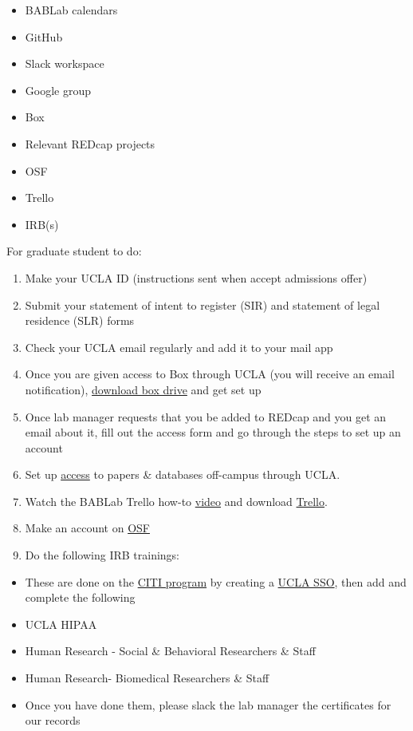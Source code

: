 \documentclass[]{book}
\providecommand{\tightlist}{%
  \setlength{\itemsep}{0pt}\setlength{\parskip}{0pt}}
\begin{document}
\begin{itemize}
\tightlist
\item
  BABLab calendars
\item
  GitHub
\item
  Slack workspace
\item
  Google group
\item
  Box
\item
  Relevant REDcap projects
\item
  OSF
\item
  Trello
\item
  IRB(s)
\end{itemize}

For graduate student to do:

\begin{enumerate}
\def\labelenumi{\arabic{enumi}.}
\tightlist
\item
  Make your UCLA ID (instructions sent when accept admissions offer)
\item
  Submit your statement of intent to register (SIR) and statement of
  legal residence (SLR) forms
\item
  Check your UCLA email regularly and add it to your mail app
\item
  Once you are given access to Box through UCLA (you will receive an
  email notification),
  \href{https://www.box.com/resources/downloads}{download box drive} and
  get set up
\item
  Once lab manager requests that you be added to REDcap and you get an
  email about it, fill out the access form and go through the steps to
  set up an account
\item
  Set up
  \href{https://www.library.ucla.edu/use/computers-computing-services/connect-campus}{access}
  to papers \& databases off-campus through UCLA.
\item
  Watch the BABLab Trello how-to
  \href{https://www.youtube.com/watch?v=_Ry-SnJygy8\&feature=youtu.be\&ab_channel=BABLab}{video}
  and download \href{https://trello.com/en-US/platforms}{Trello}.
\item
  Make an account on
  \href{https://accounts.osf.io/login?service=https://osf.io/myprojects/}{OSF}
\item
  Do the following IRB trainings:
\end{enumerate}

\begin{itemize}
\tightlist
\item
  These are done on the
  \href{https://www.research.ucla.edu/CITIProgram/}{CITI program} by
  creating a
  \href{https://ora.research.ucla.edu/OHRPP/Documents/Education/SSO_CITI_New_Acct.pdf}{UCLA
  SSO}, then add and complete the following
\item
  UCLA HIPAA
\item
  Human Research - Social \& Behavioral Researchers \& Staff
\item
  Human Research- Biomedical Researchers \& Staff
\item
  Once you have done them, please slack the lab manager the certificates
  for our records
\end{itemize}
\end{document}
